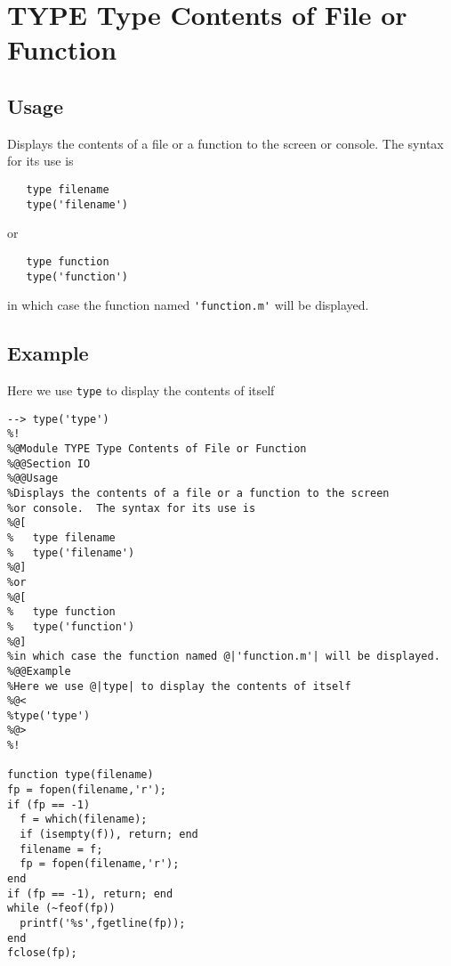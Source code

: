 \section{TYPE Type Contents of File or Function}

\subsection{Usage}

Displays the contents of a file or a function to the screen
or console.  The syntax for its use is
\begin{verbatim}
   type filename
   type('filename')
\end{verbatim}
or
\begin{verbatim}
   type function
   type('function')
\end{verbatim}
in which case the function named \verb|'function.m'| will be displayed.
\subsection{Example}

Here we use \verb|type| to display the contents of itself 
\begin{verbatim}
--> type('type')
%!
%@Module TYPE Type Contents of File or Function
%@@Section IO
%@@Usage
%Displays the contents of a file or a function to the screen
%or console.  The syntax for its use is
%@[
%   type filename
%   type('filename')
%@]
%or
%@[
%   type function
%   type('function')
%@]
%in which case the function named @|'function.m'| will be displayed.
%@@Example
%Here we use @|type| to display the contents of itself 
%@<
%type('type')
%@>
%!

function type(filename)
fp = fopen(filename,'r');
if (fp == -1)
  f = which(filename);
  if (isempty(f)), return; end
  filename = f;
  fp = fopen(filename,'r');
end
if (fp == -1), return; end
while (~feof(fp))
  printf('%s',fgetline(fp));
end
fclose(fp);
\end{verbatim}
